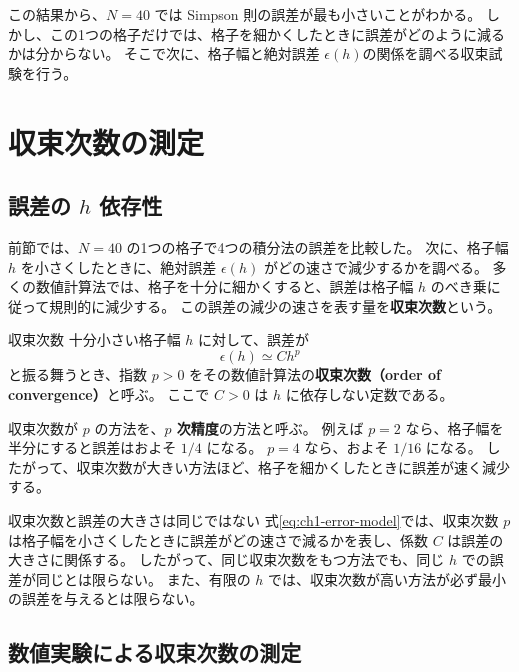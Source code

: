 この結果から、$N=40$ では Simpson 則の誤差が最も小さいことがわかる。
しかし、この1つの格子だけでは、格子を細かくしたときに誤差がどのように減るかは分からない。
そこで次に、格子幅と絶対誤差 $\epsilon(h)$の関係を調べる収束試験を行う。

\section{収束次数の測定}
\label{sec:ch1-convergence}

\subsection{誤差の $h$ 依存性}

前節では、$N=40$ の1つの格子で4つの積分法の誤差を比較した。
次に、格子幅 $h$ を小さくしたときに、絶対誤差 $\epsilon(h)$ がどの速さで減少するかを調べる。
多くの数値計算法では、格子を十分に細かくすると、誤差は格子幅 $h$ のべき乗に従って規則的に減少する。
この誤差の減少の速さを表す量を\textbf{収束次数}という。

\begin{definitionbox}{収束次数}
十分小さい格子幅 $h$ に対して、誤差が
\begin{equation}
 \epsilon(h)\simeq C h^p
\label{eq:ch1-error-model}
\end{equation}
と振る舞うとき、指数 $p>0$ をその数値計算法の\textbf{収束次数（order of convergence）}と呼ぶ。
ここで $C>0$ は $h$ に依存しない定数である。
\end{definitionbox}

収束次数が $p$ の方法を、\textbf{$p$ 次精度}の方法と呼ぶ。
例えば $p=2$ なら、格子幅を半分にすると誤差はおよそ $1/4$ になる。
$p=4$ なら、およそ $1/16$ になる。
したがって、収束次数が大きい方法ほど、格子を細かくしたときに誤差が速く減少する。

\begin{cautionblock}{収束次数と誤差の大きさは同じではない}
式\eqref{eq:ch1-error-model}では、収束次数 $p$ は格子幅を小さくしたときに誤差がどの速さで減るかを表し、係数 $C$ は誤差の大きさに関係する。
したがって、同じ収束次数をもつ方法でも、同じ $h$ での誤差が同じとは限らない。
また、有限の $h$ では、収束次数が高い方法が必ず最小の誤差を与えるとは限らない。
\end{cautionblock}

\subsection{数値実験による収束次数の測定}

